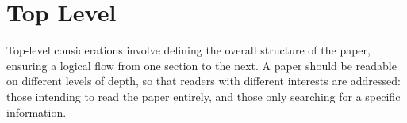 
\chapter{Top Level}
\label{ch:toplevel}

Top-level considerations involve defining the overall structure of the paper, ensuring a logical flow from one section to the next.
A paper should be readable on different levels of depth, so that readers with different interests are addressed:
those intending to read the paper entirely, and those only searching for a specific information.






